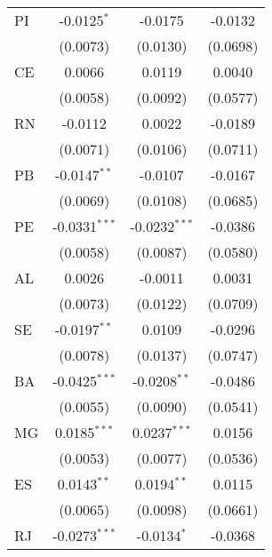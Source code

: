 \begin{tabular}{lccc}
   PI              & -0.0125$^{*}$           & -0.0175                 & -0.0132\\   
                   & (0.0073)                & (0.0130)                & (0.0698)\\   
   CE              & 0.0066                  & 0.0119                  & 0.0040\\   
                   & (0.0058)                & (0.0092)                & (0.0577)\\   
   RN              & -0.0112                 & 0.0022                  & -0.0189\\   
                   & (0.0071)                & (0.0106)                & (0.0711)\\   
   PB              & -0.0147$^{**}$          & -0.0107                 & -0.0167\\   
                   & (0.0069)                & (0.0108)                & (0.0685)\\   
   PE              & -0.0331$^{***}$         & -0.0232$^{***}$         & -0.0386\\   
                   & (0.0058)                & (0.0087)                & (0.0580)\\   
   AL              & 0.0026                  & -0.0011                 & 0.0031\\   
                   & (0.0073)                & (0.0122)                & (0.0709)\\   
   SE              & -0.0197$^{**}$          & 0.0109                  & -0.0296\\   
                   & (0.0078)                & (0.0137)                & (0.0747)\\   
   BA              & -0.0425$^{***}$         & -0.0208$^{**}$          & -0.0486\\   
                   & (0.0055)                & (0.0090)                & (0.0541)\\   
   MG              & 0.0185$^{***}$          & 0.0237$^{***}$          & 0.0156\\   
                   & (0.0053)                & (0.0077)                & (0.0536)\\   
   ES              & 0.0143$^{**}$           & 0.0194$^{**}$           & 0.0115\\   
                   & (0.0065)                & (0.0098)                & (0.0661)\\   
   RJ              & -0.0273$^{***}$         & -0.0134$^{*}$           & -0.0368\\   

\end{tabular}

